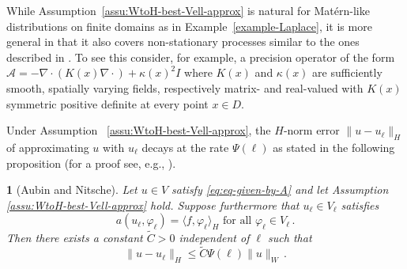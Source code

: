 \documentclass[11pt,english]{article}
\theoremstyle{plain}
\theoremstyle{plain}
\newtheorem{prop}[thm]{\protect\propositionname}
\theoremstyle{plain}
\theoremstyle{plain}
\numberwithin{equation}{section}
\newcommand*{\id}{I}
\newcommand{\rev}[1]{#1}
\providecommand{\propositionname}{Proposition}
\begin{document}
%
\noindent
\rev{While Assumption~\ref{assu:WtoH-best-Vell-approx} is natural for
  Mat\'{e}rn-like distributions on finite domains as in
  Example~\ref{example-Laplace}, it is more general in that it also
  covers non-stationary processes similar to the ones described in
  \cite{fuglstad2015exploring}. To see this consider, for example, a
  precision operator of the form \mbox{$\mathcal{A}=-\nabla\cdot
    (K(x)\nabla \cdot ) + \kappa(x)^2\id$} where $K(x)$ and
  $\kappa(x)$ are sufficiently smooth, spatially varying fields,
  respectively matrix- and real-valued with $K(x)$ symmetric positive
  definite at every point $x\in D$.}

Under Assumption~%
\ref{assu:WtoH-best-Vell-approx}, the $H$-norm error $\|u-u_{\ell}\|_{H}$
of approximating $u$ with $u_{\ell}$ decays at the rate $\Psi(\ell)$
as stated in the following proposition (for a proof see, e.g., \cite[Proof of Theorem 8.65]{Hackbusch.W_2017_book_elliptic_2nd}).
\begin{prop}[Aubin and Nitsche]
  \label{prop:Aubin-Nitsche}
  Let $u\in V$ satisfy \eqref{eq:eq-given-by-A} and let Assumption~%
  \ref{assu:WtoH-best-Vell-approx}
  hold. Suppose furthermore that
  $u_{\ell}\in V_{\ell}$ satisfies
  \[
    a(u_{\ell},\varphi_{\ell})=\langle
    f,\varphi_{\ell}\rangle_{H}\text{ for all }\varphi_{\ell}\in
    V_{\ell}\,.
  \]
  Then there exists a constant $\tilde{C}>0$ independent of $\ell$
  such that
	\[
		\|u-u_{\ell}\|_{H}\leq\tilde{C}\Psi(\ell)\|u\|_{W}\,.
	\]
\end{prop}
\end{document}
